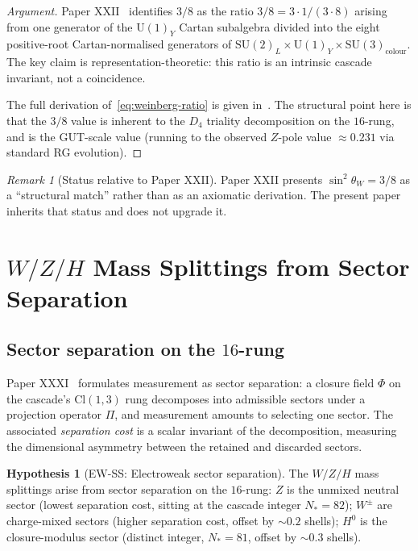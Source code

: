 \documentclass[12pt]{article}
\theoremstyle{definition}
\newtheorem{hypothesis}[theorem]{Hypothesis}
\theoremstyle{remark}
\newtheorem{remark}[theorem]{Remark}
\begin{document}
\begin{proof}[Argument]
Paper XXII~\citep{SmartXXII} identifies $3/8$ as the ratio $3/8 = 3 \cdot 1 / (3 \cdot 8)$ arising from one generator of the $\mathrm{U}(1)_Y$ Cartan subalgebra divided into the eight positive-root Cartan-normalised generators of $\mathrm{SU}(2)_L \times \mathrm{U}(1)_Y \times \mathrm{SU}(3)_{\mathrm{colour}}$. The key claim is representation-theoretic: this ratio is an intrinsic cascade invariant, not a coincidence.

The full derivation of~\eqref{eq:weinberg-ratio} is given in~\citep{SmartXXII}. The structural point here is that the $3/8$ value is inherent to the $D_4$ triality decomposition on the $16$-rung, and is the GUT-scale value (running to the observed $Z$-pole value $\approx 0.231$ via standard RG evolution).
\end{proof}

\begin{remark}[Status relative to Paper XXII]
Paper XXII presents $\sin^2 \theta_W = 3/8$ as a ``structural match'' rather than as an axiomatic derivation. The present paper inherits that status and does not upgrade it.
\end{remark}

\section{$W/Z/H$ Mass Splittings from Sector Separation}\label{sec:sector-sep}

\subsection{Sector separation on the $16$-rung}

Paper XXXI~\citep{SmartXXXI} formulates measurement as sector separation: a closure field $\Phi$ on the cascade's $\mathrm{Cl}(1,3)$ rung decomposes into admissible sectors under a projection operator $\Pi$, and measurement amounts to selecting one sector. The associated \emph{separation cost} is a scalar invariant of the decomposition, measuring the dimensional asymmetry between the retained and discarded sectors.

\begin{hypothesis}[EW-SS: Electroweak sector separation]\label{hyp:ew-ss}
The $W/Z/H$ mass splittings arise from sector separation on the $16$-rung: $Z$ is the unmixed neutral sector (lowest separation cost, sitting at the cascade integer $N_* = 82$); $W^\pm$ are charge-mixed sectors (higher separation cost, offset by $\sim 0.2$ shells); $H^0$ is the closure-modulus sector (distinct integer, $N_* = 81$, offset by $\sim 0.3$ shells).
\end{hypothesis}
\end{document}
